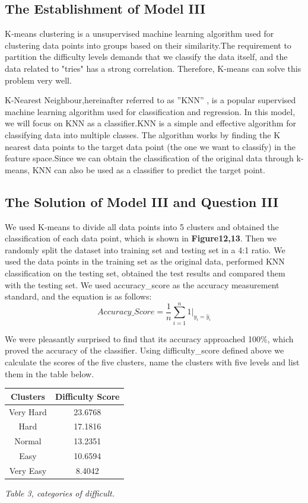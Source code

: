 \documentclass[12pt]{article}
\begin{document}
\subsection{The Establishment of Model III}
K-means clustering is a unsupervised machine learning algorithm used for clustering data points into groups based on their similarity.The requirement to partition the difficulty levels demands that we classify the data itself, and the data related to "tries" has a strong correlation. Therefore, K-means can solve this problem very well.

K-Nearest Neighbour,hereinafter referred to as ”KNN” , is a popular supervised machine learning algorithm used for classification and regression. In this model, we will focus on KNN as a classifier.KNN is a simple and effective algorithm for classifying data into multiple classes. The algorithm works by finding the K nearest data points to the target data point (the one we want to classify) in the feature space.Since we can obtain the classification of the original data through k-means, KNN can also be used as a classifier to predict the target point.

\subsection{The Solution of Model III and Question III}
We used K-means to divide all data points into 5 clusters and obtained the classification of each data point, which is shown in \textbf{Figure12,13}. Then we randomly split the dataset into training set and testing set in a 4:1 ratio. We used the data points in the training set as the original data, performed KNN classification on the testing set, obtained the test results and compared them with the testing set. We used accuracy\_score as the accuracy measurement standard, and the equation is as follows:
\begin{equation*}
	Accuracy\_Score = \frac{1}{n} \sum\limits_{i=1}^{n} 1|_{y_i = \hat{y}_i}
\end{equation*}

We were pleasantly surprised to find that its accuracy approached 100\%, which proved the accuracy of the classifier. Using difficulty\_score defined above we calculate the scores of the five clusters, name the clusters with five levels and list them in the table below.

\begin{center}
	

\begin{tabular}{c c}
\hline
Clusters&Difficulty Score\\
\hline
Very Hard & 23.6768\\
Hard & 17.1816\\
Normal & 13.2351\\
Easy & 10.6594\\
Very Easy & 8.4042\\
\hline
\end{tabular}

\vspace{0.3cm}
\textit{Table 3, categories of difficult.}
\end{center}
\end{document}
